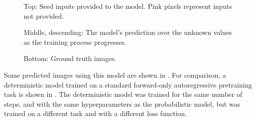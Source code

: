 \begin{figure}
{    Top: Seed inputs provided to the model. Pink pixels represent inputs not provided.

    Middle, descending: The model's prediction over the unknown values as the training process progresses.

    Bottom: Ground truth images.}
    \label{fig:training-deterministic}
\end{figure}

Some predicted images using this model are shown in . For comparison, a deterministic model trained on a standard forward-only autoregressive pretraining task is shown in . The deterministic model was trained for the same number of steps, and with the same hyperparameters as the probabilistic model, but was trained on a different task and with a different loss function.

